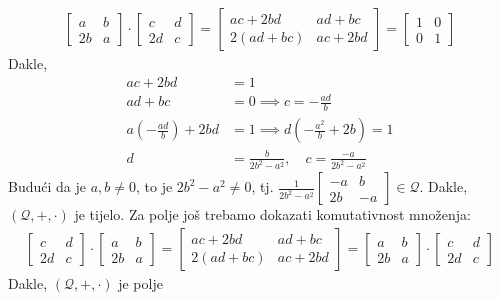 \documentclass{exam}
\begin{document}
\begin{questions}
\begin{solution}
  \begin{align*}
    \begin{bmatrix}
      a & b\\
      2b & a
    \end{bmatrix} \cdot
    \begin{bmatrix}
      c & d\\
      2d & c
    \end{bmatrix} =
    \begin{bmatrix}
      ac + 2bd & ad + bc\\
      2(ad + bc) & ac + 2bd
    \end{bmatrix} =
    \begin{bmatrix}
      1 & 0\\
      0 & 1
    \end{bmatrix}
  \end{align*}
  Dakle,
  \begin{align*}
    ac + 2bd &= 1\\
    ad + bc &= 0 \implies c = -\frac{ad}{b}\\
    a\left(-\frac{ad}{b}\right) + 2bd &= 1 \implies d \left(-\frac{a^2}{b} + 2b \right) = 1\\
    d &= \frac{b}{2b^2-a^2}, \quad c = \frac{-a}{2b^2-a^2}
  \end{align*}
  Budući da je $a, b \neq 0$, to je $2b^2 - a^2 \neq 0$, tj. $\frac{1}{2b^2-a^2}
  \begin{bmatrix}
    -a & b\\
    2b & -a
  \end{bmatrix} \in \mathcal{Q}$. Dakle, $(\mathcal{Q}, +, \cdot)$ je tijelo. Za polje još trebamo dokazati komutativnost množenja:
  \begin{align*}
    \begin{bmatrix}
      c & d\\
      2d & c
    \end{bmatrix} \cdot
    \begin{bmatrix}
      a & b\\
      2b & a
    \end{bmatrix}
    =
    \begin{bmatrix}
      ac + 2bd & ad + bc\\
      2(ad + bc) & ac + 2bd
    \end{bmatrix} =
    \begin{bmatrix}
      a & b\\
      2b & a
    \end{bmatrix} \cdot
    \begin{bmatrix}
      c & d\\
      2d & c
    \end{bmatrix}
  \end{align*}
  Dakle, $(\mathcal{Q}, +, \cdot)$ je polje
\end{solution}


\end{questions}
\end{document}
